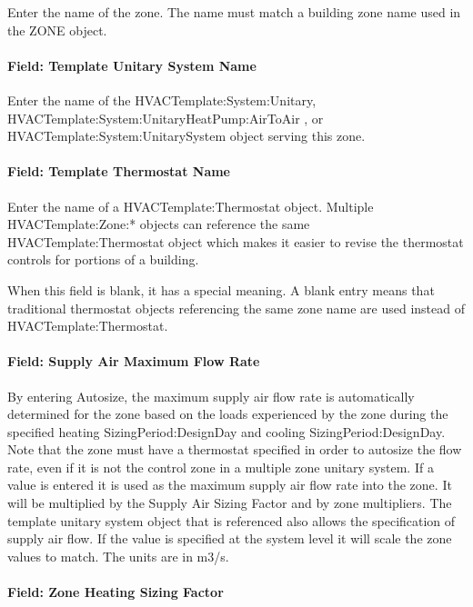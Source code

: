 Enter the name of the zone. The name must match a building zone name used in the ZONE object.

\paragraph{Field: Template Unitary System Name}\label{field-template-unitary-system-name}

Enter the name of the HVACTemplate:System:Unitary, HVACTemplate:System:UnitaryHeatPump:AirToAir , or HVACTemplate:System:UnitarySystem object serving this zone.

\paragraph{Field: Template Thermostat Name}\label{field-template-thermostat-name-7}

Enter the name of a HVACTemplate:Thermostat object. Multiple HVACTemplate:Zone:* objects can reference the same HVACTemplate:Thermostat object which makes it easier to revise the thermostat controls for portions of a building.

When this field is blank, it has a special meaning. A blank entry means that traditional thermostat objects referencing the same zone name are used instead of HVACTemplate:Thermostat.

\paragraph{Field: Supply Air Maximum Flow Rate}\label{field-supply-air-maximum-flow-rate-1}

By entering Autosize, the maximum supply air flow rate is automatically determined for the zone based on the loads experienced by the zone during the specified heating SizingPeriod:DesignDay and cooling SizingPeriod:DesignDay. Note that the zone must have a thermostat specified in order to autosize the flow rate, even if it is not the control zone in a multiple zone unitary system. If a value is entered it is used as the maximum supply air flow rate into the zone. It will be multiplied by the Supply Air Sizing Factor and by zone multipliers. The template unitary system object that is referenced also allows the specification of supply air flow. If the value is specified at the system level it will scale the zone values to match. The units are in m3/s.

\paragraph{Field: Zone Heating Sizing Factor}\label{field-zone-heating-sizing-factor-6}


